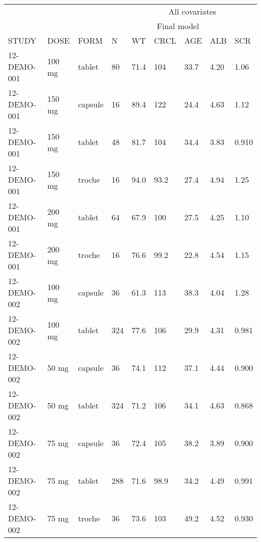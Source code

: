 \setlength{\tabcolsep}{5pt} 
\begin{threeparttable}
\renewcommand{\arraystretch}{1.3}
\begin{tabular}[h]{lllllllll}
\hline
\multicolumn{4}{c}{} & \multicolumn{5}{c}{All covariates} \\
\cmidrule(lr){5-9}
\multicolumn{5}{c}{} & \multicolumn{2}{c}{Final model} & \multicolumn{2}{c}{} \\
\cmidrule(lr){6-7}
STUDY & DOSE & FORM & N & WT & CRCL & AGE & ALB & SCR \\
\hline
12-DEMO-001 & 100 mg & tablet & 80 & 71.4 & 104 & 33.7 & 4.20 & 1.06 \\
12-DEMO-001 & 150 mg & capsule & 16 & 89.4 & 122 & 24.4 & 4.63 & 1.12 \\
12-DEMO-001 & 150 mg & tablet & 48 & 81.7 & 104 & 34.4 & 3.83 & 0.910 \\
12-DEMO-001 & 150 mg & troche & 16 & 94.0 & 93.2 & 27.4 & 4.94 & 1.25 \\
12-DEMO-001 & 200 mg & tablet & 64 & 67.9 & 100 & 27.5 & 4.25 & 1.10 \\
12-DEMO-001 & 200 mg & troche & 16 & 76.6 & 99.2 & 22.8 & 4.54 & 1.15 \\
12-DEMO-002 & 100 mg & capsule & 36 & 61.3 & 113 & 38.3 & 4.04 & 1.28 \\
12-DEMO-002 & 100 mg & tablet & 324 & 77.6 & 106 & 29.9 & 4.31 & 0.981 \\
12-DEMO-002 & 50 mg & capsule & 36 & 74.1 & 112 & 37.1 & 4.44 & 0.900 \\
12-DEMO-002 & 50 mg & tablet & 324 & 71.2 & 106 & 34.1 & 4.63 & 0.868 \\
12-DEMO-002 & 75 mg & capsule & 36 & 72.4 & 105 & 38.2 & 3.89 & 0.900 \\
12-DEMO-002 & 75 mg & tablet & 288 & 71.6 & 98.9 & 34.2 & 4.49 & 0.991 \\
12-DEMO-002 & 75 mg & troche & 36 & 73.6 & 103 & 49.2 & 4.52 & 0.930 \\
\hline
\end{tabular}
\end{threeparttable}
